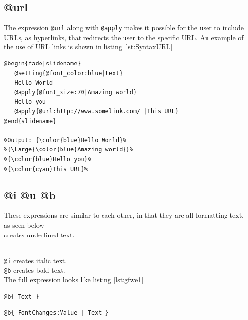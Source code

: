 {{\subsection{@url}
The expression \lstinline!@url! along with \lstinline!@apply! makes it possible for the user to include URLs, as hyperlinks, that redirects the user to the specific URL.
An example of the use of URL links is shown in listing \ref{lst:SyntaxURL}

\begin{lstlisting}[frame=single, caption=Hello World with an URL, label=lst:SyntaxURL]
@begin{fade|slidename}
   @setting{@font_color:blue|text}
   Hello World
   @apply{@font_size:70|Amazing world}
   Hello you
   @apply{@url:http://www.somelink.com/ |This URL}
@end{slidename}

%Output: {\color{blue}Hello World}%
%{\Large{\color{blue}Amazing world}}%
%{\color{blue}Hello you}%
%{\color{cyan}This URL}%
\end{lstlisting}

\subsection{@i @u @b}
These expressions are similar to each other, in that they are all formatting text, as seen below \\

 creates underlined text.} \\
\lstinline!@i! creates italic text. \\
\lstinline!@b! creates bold text. \\
The full expression looks like listing \ref{lst:gfwe1}
\begin{lstlisting}[frame=single, caption=Generic \texttt{font weight} expression example, label=lst:gfwe1]
@b{ Text }
\end{lstlisting}


\begin{lstlisting}[frame=single, caption=Generic \texttt{font weight} expression example, label=lst:gfwe2]
@b{ FontChanges:Value | Text }
\end{lstlisting}

}
